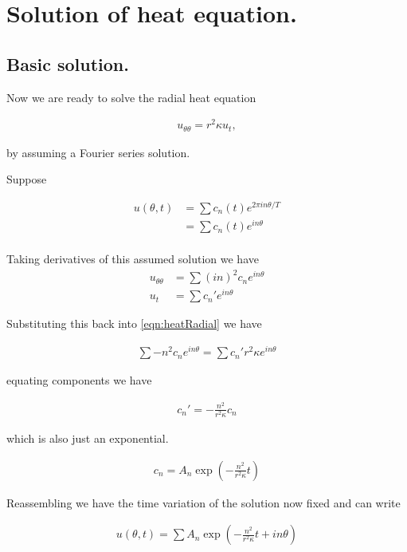 \documentclass{article}
\begin{document}
\section{ Solution of heat equation. } 

\subsection{ Basic solution. }

Now we are ready to solve the radial heat equation

\begin{align}\label{eqn:heatRadial}
u_{\theta\theta} = r^2 \kappa u_t,
\end{align}

by assuming a Fourier series solution.

Suppose

\begin{align*}
u(\theta, t) 
&= \sum c_n(t) e^{2 \pi i n \theta / T} \\
&= \sum c_n(t) e^{i n \theta} \\
\end{align*}

Taking derivatives of this assumed solution we have
\begin{align*}
u_{\theta\theta} &= \sum (i n)^2 c_n e^{i n \theta} \\
u_{t} &= \sum c_n' e^{i n \theta}
\end{align*}

Substituting this back into \ref{eqn:heatRadial} we have

\begin{align*}
\sum - n^2 c_n e^{ i n \theta} = \sum c_n' r^2 \kappa e^{i n \theta}
\end{align*}

equating components we have 

\begin{align*}
c_n' = - \frac{n^2}{ r^2 \kappa } c_n 
\end{align*}

which is also just an exponential.

\begin{align*}
c_n = A_n \exp\left(- \frac{n^2}{ r^2 \kappa } t \right)
\end{align*}

Reassembling we have the time variation of the solution now fixed and can write

\begin{align}
u(\theta, t) = \sum A_n \exp\left(- \frac{n^2}{ r^2 \kappa } t + i n \theta\right)
\end{align}
\end{document}
